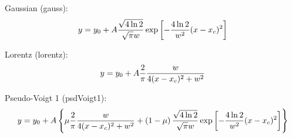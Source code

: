 \documentclass{article}
\begin{document}
	Gaussian (gauss):
	\begin{equation}
		y = y_0 + A\*\frac{\sqrt{4\*\ln{2}}}{\sqrt{\pi}\*w}\*\exp\left[-\frac{4\*\ln{2}}{w^2}\*(x-x_c)^2\right] \nonumber
	\end{equation}

	Lorentz (lorentz):
	\begin{equation}
		y = y_0 + A\*\frac{2}{\pi}\*\frac{w}{4\*(x-x_c)^2+w^2} \nonumber
	\end{equation}

	Pseudo-Voigt 1 (psdVoigt1):
	\begin{equation}
		y = y_0 + A\left\{\mu\*\frac{2}{\pi}\*\frac{w}{4\*(x-x_c)^2+w^2} + \left(1-\mu\right)\*\frac{\sqrt{4\*\ln{2}}}{\sqrt{\pi}\*w}\*\exp\left[-\frac{4\*\ln{2}}{w^2}\*(x-x_c)^2\right]\right\} \nonumber
	\end{equation}
\end{document}
